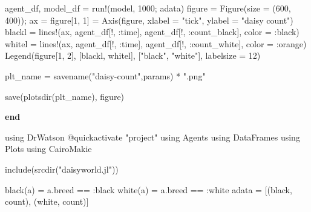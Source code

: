 \documentclass[
  english,
  russian,
  12pt,
  a4paper,
  DIV=11,
  numbers=noendperiod]{scrreprt}
\newenvironment{Shaded}{\begin{snugshade}}{\end{snugshade}}
\newcommand{\BuiltInTok}[1]{\textcolor[rgb]{0.00,0.23,0.31}{#1}}
\newcommand{\ControlFlowTok}[1]{\textcolor[rgb]{0.00,0.23,0.31}{\textbf{#1}}}
\newcommand{\FloatTok}[1]{\textcolor[rgb]{0.68,0.00,0.00}{#1}}
\newcommand{\FunctionTok}[1]{\textcolor[rgb]{0.28,0.35,0.67}{#1}}
\newcommand{\ImportTok}[1]{\textcolor[rgb]{0.00,0.46,0.62}{#1}}
\newcommand{\NormalTok}[1]{\textcolor[rgb]{0.00,0.23,0.31}{#1}}
\newcommand{\OperatorTok}[1]{\textcolor[rgb]{0.37,0.37,0.37}{#1}}
\newcommand{\PreprocessorTok}[1]{\textcolor[rgb]{0.68,0.00,0.00}{#1}}
\newcommand{\StringTok}[1]{\textcolor[rgb]{0.13,0.47,0.30}{#1}}
\begin{document}
\begin{Shaded}
\begin{Highlighting}[]
\NormalTok{    agent\_df, model\_df }\OperatorTok{=} \FunctionTok{run!}\NormalTok{(model, }\FloatTok{1000}\NormalTok{; adata)}
\NormalTok{    figure }\OperatorTok{=} \FunctionTok{Figure}\NormalTok{(size }\OperatorTok{=}\NormalTok{ (}\FloatTok{600}\NormalTok{, }\FloatTok{400}\NormalTok{));}
\NormalTok{    ax }\OperatorTok{=}\NormalTok{ figure[}\FloatTok{1}\NormalTok{, }\FloatTok{1}\NormalTok{] }\OperatorTok{=} \FunctionTok{Axis}\NormalTok{(figure, xlabel }\OperatorTok{=} \StringTok{"tick"}\NormalTok{, ylabel }\OperatorTok{=} \StringTok{"daisy count"}\NormalTok{)}
\NormalTok{    blackl }\OperatorTok{=} \FunctionTok{lines!}\NormalTok{(ax, agent\_df[!, }\OperatorTok{:}\NormalTok{time], agent\_df[!, }\OperatorTok{:}\NormalTok{count\_black], color }\OperatorTok{=} \OperatorTok{:}\NormalTok{black)}
\NormalTok{    whitel }\OperatorTok{=} \FunctionTok{lines!}\NormalTok{(ax, agent\_df[!, }\OperatorTok{:}\NormalTok{time], agent\_df[!, }\OperatorTok{:}\NormalTok{count\_white], color }\OperatorTok{=} \OperatorTok{:}\NormalTok{orange)}
    \FunctionTok{Legend}\NormalTok{(figure[}\FloatTok{1}\NormalTok{, }\FloatTok{2}\NormalTok{], [blackl, whitel], [}\StringTok{"black"}\NormalTok{, }\StringTok{"white"}\NormalTok{], labelsize }\OperatorTok{=} \FloatTok{12}\NormalTok{)}

\NormalTok{    plt\_name }\OperatorTok{=} \FunctionTok{savename}\NormalTok{(}\StringTok{"daisy{-}count"}\NormalTok{,params) }\OperatorTok{*} \StringTok{".png"}

    \FunctionTok{save}\NormalTok{(}\FunctionTok{plotsdir}\NormalTok{(plt\_name), figure)}

\ControlFlowTok{end}


\ImportTok{using} \BuiltInTok{DrWatson}
\PreprocessorTok{@quickactivate} \StringTok{"project"}
\ImportTok{using} \BuiltInTok{Agents}
\ImportTok{using} \BuiltInTok{DataFrames}
\ImportTok{using} \BuiltInTok{Plots}
\ImportTok{using} \BuiltInTok{CairoMakie}

\FunctionTok{include}\NormalTok{(}\FunctionTok{srcdir}\NormalTok{(}\StringTok{"daisyworld.jl"}\NormalTok{))}


\FunctionTok{black}\NormalTok{(a) }\OperatorTok{=}\NormalTok{ a.breed }\OperatorTok{==} \OperatorTok{:}\NormalTok{black}
\FunctionTok{white}\NormalTok{(a) }\OperatorTok{=}\NormalTok{ a.breed }\OperatorTok{==} \OperatorTok{:}\NormalTok{white}
\NormalTok{adata }\OperatorTok{=}\NormalTok{ [(black, count), (white, count)]}


\end{Highlighting}
\end{Shaded}
\end{document}
